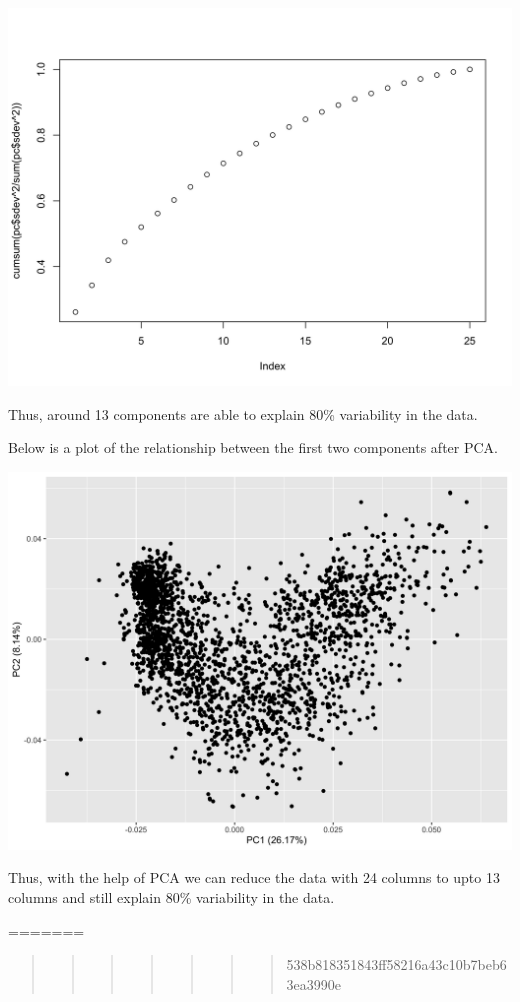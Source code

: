 \documentclass[
  a4paperpaper,
  DIV=11,
  numbers=noendperiod]{scrartcl}
\begin{document}
\includegraphics{Report_files/figure-pdf/unnamed-chunk-11-1.png}

Thus, around 13 components are able to explain 80\% variability in the
data.

Below is a plot of the relationship between the first two components
after PCA.

\includegraphics{Report_files/figure-pdf/unnamed-chunk-12-1.png}

Thus, with the help of PCA we can reduce the data with 24 columns to
upto 13 columns and still explain 80\% variability in the data.

=======

\begin{quote}
\begin{quote}
\begin{quote}
\begin{quote}
\begin{quote}
\begin{quote}
\begin{quote}
538b818351843ff58216a43c10b7beb63ea3990e
\end{quote}
\end{quote}
\end{quote}
\end{quote}
\end{quote}
\end{quote}
\end{quote}
\end{document}
